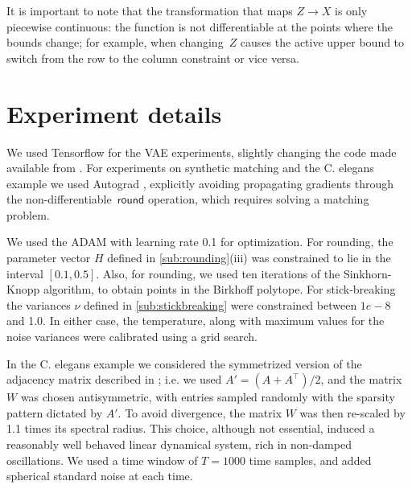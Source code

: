 \documentclass[twoside]{article}
\begin{document}

It is important to note that the transformation that maps
$Z \rightarrow X$ is only piecewise continuous: the function is not
differentiable at the points where the bounds change; for example,
when changing~$Z$ causes the active upper bound to switch from the row
to the column constraint or vice versa.



\section{Experiment details}
We used Tensorflow \citep{Abadi2016} for the VAE experiments, slightly
changing the code made available from \cite{jang2016categorical}. For
experiments on synthetic matching and the C. elegans example we used
Autograd \citep{maclaurin2015autograd}, explicitly avoiding
propagating gradients through the non-differentiable~$\mathsf{round}$
operation, which requires solving a matching problem.

We used the ADAM with learning rate 0.1 for optimization. For
rounding, the parameter vector $H$ defined in \ref{sub:rounding}(iii)
was constrained to lie in the interval $[0.1, 0.5]$. Also, for
rounding, we used ten iterations of the Sinkhorn-Knopp algorithm, to
obtain points in the Birkhoff polytope. For stick-breaking the
variances $\nu$ defined in \ref{sub:stickbreaking} were constrained
between $1e-8$ and 1.0. In either case, the temperature, along with
maximum values for the noise variances were calibrated using a grid
search.
 
In the C. elegans example we considered the symmetrized version of the adjacency matrix described in \citep{varshney2011structural}; i.e. we used $A'=(A+A^\top)/2$, and the matrix $W$ was chosen antisymmetric, with entries sampled randomly with the sparsity pattern dictated by $A'$. To avoid divergence, the matrix $W$ was then re-scaled by 1.1 times its spectral radius. This choice, although not essential, induced a reasonably well behaved linear dynamical system, rich in non-damped oscillations. We used a time window of $T=1000$ time samples, and added spherical standard noise at each time. 




\end{document}
